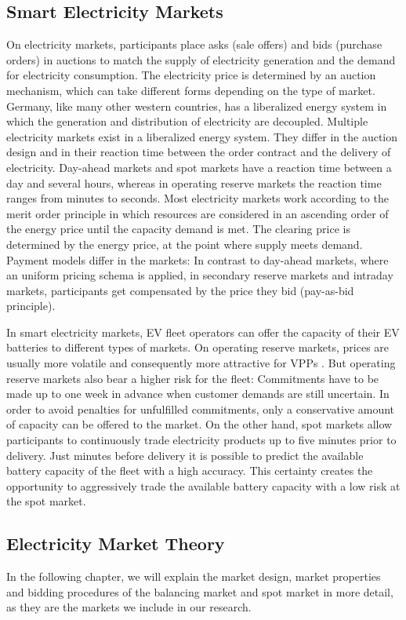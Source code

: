 \documentclass[a4paper, 12pt]{article}
\let\cite\shortcite
\begin{document}
\subsection{Smart Electricity Markets}
\label{sec:org23c7ff0}
On electricity markets, participants place asks (sale offers) and bids (purchase
orders) in auctions to match the supply of electricity generation and the demand
for electricity consumption. The electricity price is determined by an auction
mechanism, which can take different forms depending on the type of market.
Germany, like many other western countries, has a liberalized energy system in
which the generation and distribution of electricity are decoupled. Multiple
electricity markets exist in a liberalized energy system. They differ in the
auction design and in their reaction time between the order contract and the
delivery of electricity. Day-ahead markets and spot markets have a reaction time
between a day and several hours, whereas in operating reserve markets the
reaction time ranges from minutes to seconds. Most electricity markets work
according to the merit order principle in which resources are considered in an
ascending order of the energy price until the capacity demand is met. The
clearing price is determined by the energy price, at the point where supply
meets demand. Payment models differ in the markets: In contrast to day-ahead
markets, where an uniform pricing schema is applied, in secondary reserve
markets and intraday markets, participants get compensated by the price they bid
(pay-as-bid principle).

In smart electricity markets, EV fleet operators can offer the capacity of their
EV batteries to different types of markets. On operating reserve markets, prices
are usually more volatile and consequently more attractive for VPPs
\cite{tomic07_using_fleet_elect_drive_vehic_grid_suppor}. But operating reserve
markets also bear a higher risk for the fleet: Commitments have to be made up to
one week in advance when customer demands are still uncertain. In order to avoid
penalties for unfulfilled commitments, only a conservative amount of capacity
can be offered to the market. On the other hand, spot markets allow participants
to continuously trade electricity products up to five minutes prior to delivery.
Just minutes before delivery it is possible to predict the available battery
capacity of the fleet with a high accuracy. This certainty creates the
opportunity to aggressively trade the available battery capacity with a low risk
at the spot market.
\subsection{Electricity Market Theory}
\label{sec:orga67f11c}
In the following chapter, we will explain the market design, market properties
and bidding procedures of the balancing market and spot market in more detail,
as they are the markets we include in our research.
\end{document}
